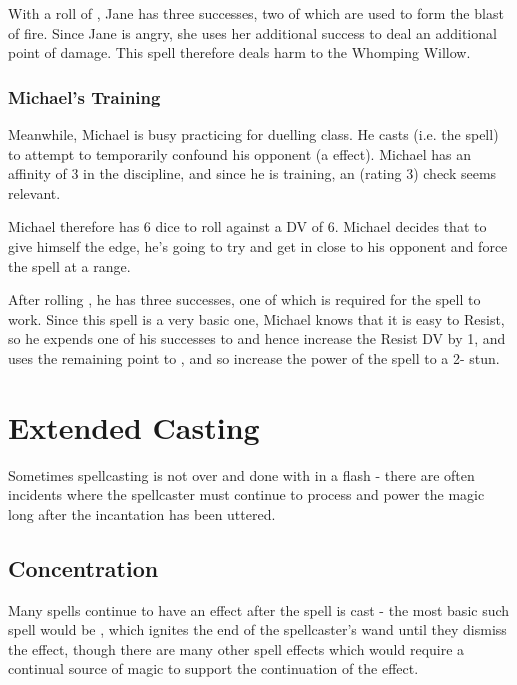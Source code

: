 With a roll of , Jane has three successes, two of which are used to form the blast of fire. Since Jane is angry, she uses her additional success to deal an additional point of damage. This spell therefore deals  harm to the Whomping Willow.


\subsubsection{Michael's Training}

Meanwhile, Michael is busy practicing for duelling class. He casts  (i.e. the  spell) to attempt to temporarily confound his opponent (a \levelOne{} effect). Michael has an affinity of 3 in the  discipline, and since he is training, an  (rating 3) check seems relevant. 

Michael therefore has 6 dice to roll against a DV of 6. Michael decides that to give himself the edge, he's going to try and get in close to his opponent and force the spell at a  range. 

After rolling , he has three successes, one of which is required for the spell to work. Since this spell is a very basic one, Michael knows that it is easy to Resist, so he expends one of his successes to  and hence increase the Resist DV by 1, and uses the remaining point to , and so increase the power of the spell to a 2- stun.



\section{Extended Casting}

Sometimes spellcasting is not over and done with in a flash - there are often incidents where the spellcaster must continue to process and power the magic long after the incantation has been uttered.

\subsection{Concentration}

Many spells continue to have an effect after the spell is cast - the most basic such spell would be , which ignites the end of the spellcaster's wand until they dismiss the effect, though there are many other spell effects which would require a continual source of magic to support the continuation of the effect.

